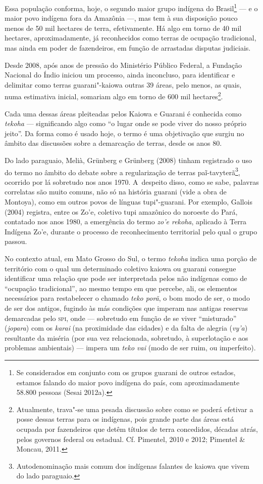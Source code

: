 Essa população conforma, hoje, o segundo maior grupo indígena do
Brasil\footnote{Se considerados em conjunto com os grupos guarani de
outros estados, estamos falando do maior povo indígena do país, com
aproximadamente 58.800 pessoas (Sesai 2012a).} --- e o maior povo
indígena fora da Amazônia ---, mas tem à sua disposição pouco menos de 50
mil hectares de terra, efetivamente. Há algo em torno de 40 mil
hectares, aproximadamente, já reconhecidos como terras de ocupação
tradicional, mas ainda em poder de fazendeiros, em função de arrastadas
disputas judiciais. 

Desde 2008, após anos de pressão do Ministério Público Federal, a
Fundação Nacional do Índio iniciou um processo, ainda inconcluso, para
identificar e delimitar como terras guarani"-kaiowa outras 39 áreas,
pelo menos, as quais, numa estimativa inicial, somariam algo em torno
de 600 mil hectares\footnote{Atualmente, trava"-se uma pesada discussão
sobre como se poderá efetivar a posse dessas terras para os indígenas,
pois grande parte das áreas está ocupada por fazendeiros que detêm
títulos de terra concedidos, décadas atrás, pelos governos federal ou
estadual. Cf. Pimentel, 2010 e 2012; Pimentel \& Moncau, 2011.}. 

Cada uma dessas áreas pleiteadas pelos Kaiowa e Guarani é conhecida como
\emph{tekoha} --- significando algo como ``o lugar onde se pode viver do nosso
próprio jeito''. Da forma como é usado hoje, o termo é uma objetivação
que surgiu no âmbito das discussões sobre a demarcação de terras, desde
os anos 80. 

Do lado paraguaio, Melià, Grünberg e Grünberg (2008) tinham registrado o
uso do termo no âmbito do debate sobre a regularização de terras
paĩ{}-tavyterã\footnote{Autodenominação mais comum dos indígenas
falantes de kaiowa que vivem do lado paraguaio.}, ocorrido por lá
sobretudo nos anos 1970. A~despeito disso, como se sabe, palavras
correlatas são muito comuns, não só na história guarani (vide a obra de
Montoya), como em outros povos de línguas tupi"-guarani. Por exemplo,
Gallois (2004) registra, entre os Zo’e, coletivo tupi amazônico do
noroeste do Pará, contatado nos anos 1980, a emergência do termo \emph{zo’e
rekoha}, aplicado à Terra Indígena Zo’e, durante o processo de
reconhecimento territorial pelo qual o grupo passou. 

No contexto atual, em Mato Grosso do Sul, o termo \emph{tekoha} indica uma
porção de território com o qual um determinado coletivo kaiowa ou
guarani consegue identificar uma relação que pode ser interpretada
pelos não indígenas como de ``ocupação tradicional'', ao mesmo tempo em
que percebe, ali, os elementos necessários para restabelecer o chamado
\emph{teko porã}, o bom modo de ser, o modo de ser dos antigos, fugindo às más
condições que imperam nas antigas reservas demarcadas pelo \textsc{spi}, onde ---
sobretudo em função de se viver ``misturado'' (\emph{jopara}) com os \emph{karai} (na
proximidade das cidades) e da falta de alegria (\emph{vy’a}) resultante da
miséria (por sua vez relacionada, sobretudo, à superlotação e aos
problemas ambientais) --- impera um \emph{teko vai} (modo de ser ruim, ou
imperfeito).

